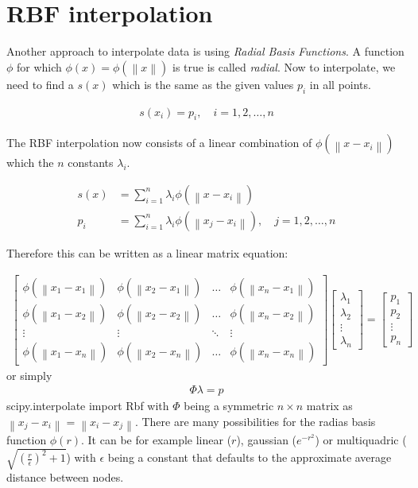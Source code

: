 \section{RBF interpolation}

Another approach to interpolate data is using \textit{Radial Basis Functions}. A function $\phi$ for which $\phi(x)=\phi(\left\|x\right\|)$ is true is called \textit{radial}. Now to interpolate, we need to find a $s(x)$ which is the same as the given values $p_i$ in all points.

\begin{align}
	s(x_i)=p_i,\quad i=1,2,\dots,n
\end{align}

The RBF interpolation now consists of a linear combination of $\phi(\left\|x-x_i\right\|)$ which the $n$ constants $\lambda_i$.

\begin{align}
	s(x)&=	\sum_{i=1}^{n}\lambda_i\phi(\left\|x-x_i\right\|) \\
	p_i&=\sum_{i=1}^{n}\lambda_i\phi(\left\|x_j-x_i\right\|),\quad j=1,2,\dots,n
\end{align}

Therefore this can be written as a linear matrix equation:

\begin{align}
	\begin{bmatrix}
		\phi(\left\|x_1-x_1\right\|) & \phi(\left\|x_2-x_1\right\|) & \dots  & \phi(\left\|x_n-x_1\right\|) \\
		\phi(\left\|x_1-x_2\right\|) & \phi(\left\|x_2-x_2\right\|) & \dots  & \phi(\left\|x_n-x_2\right\|) \\
		\vdots                       & \vdots                       & \ddots & \vdots                       \\
		\phi(\left\|x_1-x_n\right\|) & \phi(\left\|x_2-x_n\right\|) & \dots  & \phi(\left\|x_n-x_n\right\|)
	\end{bmatrix} 
	\begin{bmatrix}
		\lambda_1 \\
		\lambda_2 \\
		\vdots    \\
		\lambda_n
	\end{bmatrix}
	=
	\begin{bmatrix}
		p_1    \\
		p_2    \\
		\vdots \\
		p_n
	\end{bmatrix}
\end{align}
or simply
\begin{align}
	\Phi\lambda=p
\end{align}
scipy.interpolate import Rbf
with $\Phi$ being a symmetric $n \times n $ matrix as $\left\|x_j-x_i\right\|=\left\|x_i-x_j\right\|$. There are many possibilities for the radias basis function $\phi(r)$. It can be for example linear ($r$), gaussian ($e^{-r^2}$) or multiquadric ($\sqrt{\left(\frac{r}{\epsilon}\right)^2 + 1}$) with $\epsilon$ being a constant that defaults to the approximate average distance between nodes.

